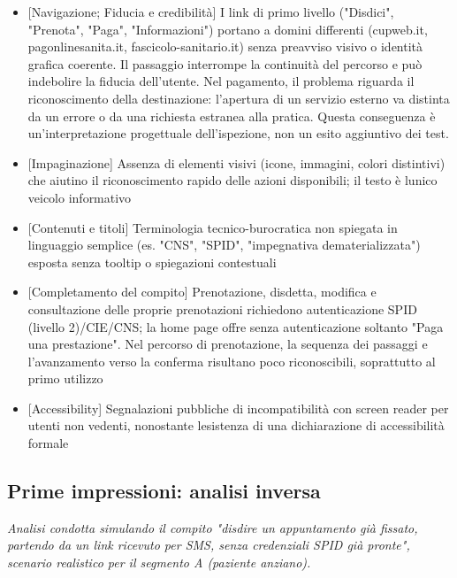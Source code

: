 \begin{itemize}
\item
  {[}Navigazione; Fiducia e credibilità{]} I link di primo livello
  ("Disdici", "Prenota", "Paga", "Informazioni") portano a domini
  differenti (cupweb.it, pagonlinesanita.it, fascicolo-sanitario.it) senza
  preavviso visivo o identità grafica coerente. Il passaggio interrompe
  la continuità del percorso e può indebolire la fiducia dell'utente.
  Nel pagamento, il problema riguarda il riconoscimento della destinazione:
  l'apertura di un servizio esterno va distinta da un errore o da una
  richiesta estranea alla pratica. Questa conseguenza è un'interpretazione
  progettuale dell'ispezione, non un esito aggiuntivo dei test.
\item
  {[}Impaginazione{]} Assenza di elementi visivi (icone, immagini, colori
  distintivi) che aiutino il riconoscimento rapido delle azioni
  disponibili; il testo è l\textquotesingle unico veicolo informativo
\item
  {[}Contenuti e titoli{]} Terminologia tecnico-burocratica non spiegata
  in linguaggio semplice (es. "CNS", "SPID", "impegnativa
  dematerializzata") esposta senza tooltip o spiegazioni contestuali
\item
  {[}Completamento del compito{]} Prenotazione, disdetta, modifica e consultazione delle proprie
  prenotazioni richiedono autenticazione SPID (livello 2)/CIE/CNS; la home page offre
  senza autenticazione soltanto "Paga una prestazione". Nel percorso di
  prenotazione, la sequenza dei passaggi e l’avanzamento verso la conferma
  risultano poco riconoscibili, soprattutto al primo utilizzo
\item
  {[}Accessibility{]} Segnalazioni pubbliche di incompatibilità con
  screen reader per utenti non vedenti, nonostante
  l\textquotesingle esistenza di una dichiarazione di accessibilità
  formale
\end{itemize}

\subsection[Analisi inversa]{Prime impressioni: analisi inversa}

\emph{Analisi condotta simulando il compito "disdire un appuntamento già
fissato, partendo da un link ricevuto per SMS, senza credenziali SPID
già pronte", scenario realistico per il segmento A (paziente
anziano).}


